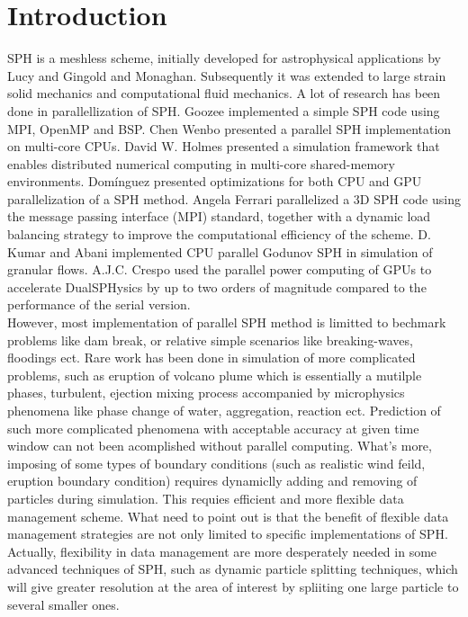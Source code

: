 \documentclass[conference,compsoc]{IEEEtran}
\begin{document}
\section{Introduction}
SPH is a meshless scheme, initially developed for astrophysical applications by Lucy\cite{lucy1977numerical} and Gingold and Monaghan\cite{gingold1977smoothed}. 
Subsequently it was extended to large strain solid mechanics and computational fluid mechanics. 
A lot of research has been done in parallellization of SPH. 
Goozee\cite{goozee2003distributed} implemented a simple SPH code using MPI, OpenMP and BSP. 
Chen Wenbo\cite{wenbo2014performance} presented a parallel SPH implementation on multi-core CPUs. 
David W. Holmes\cite{holmes2011framework} presented a simulation framework that enables distributed numerical computing in multi-core shared-memory environments. 
Domínguez\cite{dominguez2011optimization} presented optimizations for both CPU and GPU parallelization of a SPH method. 
Angela Ferrari\cite{ferrari2009new} parallelized a 3D SPH code using the message passing interface (MPI) standard, together with a dynamic load balancing strategy to improve the computational efficiency of the scheme. 
D. Kumar and Abani\cite{kumar2013parallel} implemented CPU parallel Godunov SPH in simulation of granular flows.
A.J.C. Crespo\cite{crespo2015dualsphysics} used the parallel power computing of GPUs to accelerate DualSPHysics by up to two orders of magnitude compared to the performance of the serial version.\\
However, most implementation of parallel SPH method is limitted to bechmark problems like dam break, or relative simple scenarios like breaking-waves, floodings ect. Rare work has been done in simulation of more complicated problems, such as eruption of volcano plume which is essentially a mutilple phases, turbulent, ejection mixing process accompanied by microphysics phenomena like phase change of water, aggregation, reaction ect. Prediction of such more complicated phenomena with acceptable accuracy at given time window can not been acomplished without parallel computing. What's more, imposing of some types of boundary conditions (such as realistic wind feild, eruption boundary condition) requires dynamiclly adding and removing of particles during simulation. This requies efficient and more flexible data management scheme. What need to point out is that the benefit of flexible data management strategies are not only limited to specific implementations of SPH. Actually, flexibility in data management are more desperately needed in some advanced techniques of SPH, such as dynamic particle splitting techniques\cite{vacondio2012accurate, feldman2007dynamic}, which will give greater resolution at the area of interest by spliiting one large particle to several smaller ones.
\end{document}
